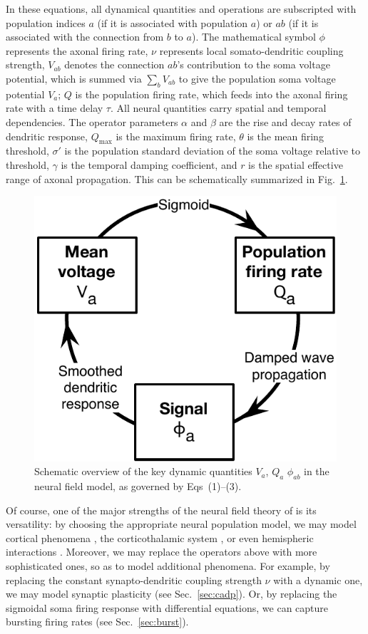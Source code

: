 \documentclass[preprint,review,10pt,authoryear,letterpaper]{elsarticle}
\begin{document}
In these equations, all dynamical quantities and operations are subscripted with population indices \(a\) (if it is associated with population \(a\)) or \(ab\) (if it is associated with the connection from \(b\) to \(a\)). The mathematical symbol \(\phi\) represents the axonal firing rate, \(\nu\) represents local somato-dendritic coupling strength, \(V_{ab}\) denotes the connection \(ab\)'s contribution to the soma voltage potential, which is summed via \(\sum_b V_{ab}\) to give the population soma voltage potential \(V_a\); \(Q\) is the population firing rate, which feeds into the axonal firing rate with a time delay \(\tau\). All neural quantities carry spatial and temporal dependencies. The operator parameters \(\alpha\) and \(\beta\) are the rise and decay rates of dendritic response, \(Q_\textrm{max}\) is the maximum firing rate, \(\theta\) is the mean firing threshold, \(\sigma'\) is the population standard deviation of the soma voltage relative to threshold, \(\gamma\) is the temporal damping coefficient, and \(r\) is the spatial effective range of axonal propagation. This can be schematically summarized in Fig.~\ref{fig:eirs_cycle}.

\begin{figure}[ht]
\begin{center}
\includegraphics[width=0.40\columnwidth]{EIRS_cycle}
\caption{Schematic overview of the key dynamic quantities \(V_a\), \(Q_a\) \(\phi_{ab}\) in the neural field model, as governed by Eqs~(1)--(3).}
\label{fig:eirs_cycle}
\end{center}
\end{figure}

Of course, one of the major strengths of the neural field theory of \citet{Robinson2005} is its versatility: by choosing the appropriate neural population model, we may model cortical phenomena \citep{}, the corticothalamic system \citep{}, or even hemispheric interactions \citep{}. Moreover, we may replace the operators above with more sophisticated ones, so as to model additional phenomena. For example, by replacing the constant synapto-dendritic coupling strength \(\nu\) with a dynamic one, we may model synaptic plasticity (see Sec.~\ref{sec:cadp}). Or, by replacing the sigmoidal soma firing response with differential equations, we can capture bursting firing rates (see Sec.~\ref{sec:burst}).
\end{document}
